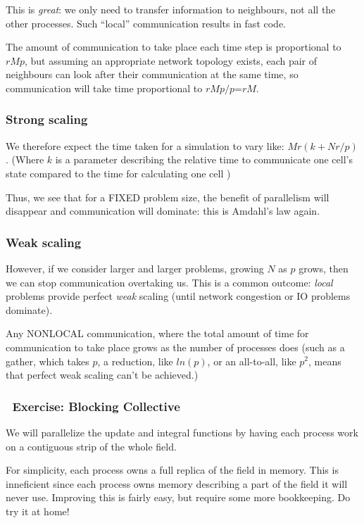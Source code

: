 This is \emph{great}: we only need to transfer information to
neighbours, not all the other processes. Such ``local'' communication
results in fast code.

The amount of communication to take place each time step is proportional
to $rMp$, but assuming an appropriate network topology exists, each pair
of neighbours can look after their communication at the same time, so
communication will take time proportional to $rMp/p$=$rM$.

\subsubsection{Strong scaling}\label{strong-scaling}

We therefore expect the time taken for a simulation to vary like:
$Mr(k+Nr/p)$. (Where $k$ is a parameter describing the relative time to
communicate one cell's state compared to the time for calculating one
cell )

Thus, we see that for a FIXED problem size, the benefit of parallelism
will disappear and communication will dominate: this is Amdahl's law
again.

\subsubsection{Weak scaling}\label{weak-scaling}

However, if we consider larger and larger problems, growing $N$ as $p$
grows, then we can stop communication overtaking us. This is a common
outcome: \emph{local} problems provide perfect \emph{weak} scaling
(until network congestion or IO problems dominate).

Any NONLOCAL communication, where the total amount of time for
communication to take place grows as the number of processes does (such
as a gather, which takes $p$, a reduction, like $ln(p)$, or an
all-to-all, like $p^2$, means that perfect weak scaling can't be
achieved.)

\subsubsection{~Exercise: Blocking
Collective}\label{exercise-blocking-collective}

We will parallelize the update and integral functions by having each
process work on a contiguous strip of the whole field.

For simplicity, each process owns a full replica of the field in memory.
This is inneficient since each process owns memory describing a part of
the field it will never use. Improving this is fairly easy, but require
some more bookkeeping. Do try it at home!

